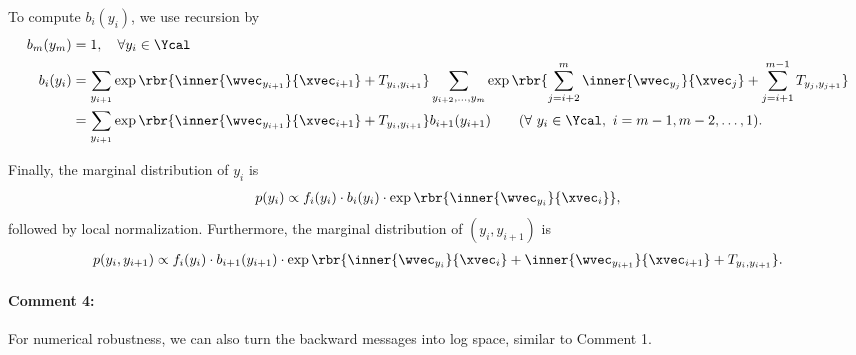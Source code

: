 \documentclass[11pt]{report}
\begin{document}
To compute $b_i(y_i)$, we use recursion by
\begin{align}
	\label{eq:rec_Z_forward_1}
	b_m(y_m) &= 1, \quad \forall y_i \in \Ycal \\
	b_i(y_i) &= \sum_{y_{i+1}} \exp \rbr{\inner{\wvec_{y_{i+1}}}{\xvec_{i+1}} + T_{y_{i}, y_{i+1}}}
	\sum_{y_{i+2}, \ldots, y_m} \exp \rbr{\sum_{j=i+2}^{m} \inner{\wvec_{y_j}}{\xvec_j} + \sum_{j=i+1}^{m-1} T_{y_j, y_{j+1}}} \\
	\label{eq:rec_Z_forward_2}
	&= \sum_{y_{i+1}}\exp \rbr{\inner{\wvec_{y_{i+1}}}{\xvec_{i+1}} + T_{y_{i}, y_{i+1}}} b_{i+1}(y_{i+1})  \qquad (\forall\ y_i \in \Ycal, \ i = m-1, m-2, \ldots, 1).	 
\end{align}

Finally, the marginal distribution of $y_i$ is
\begin{align}
	p(y_i) \propto f_i(y_i) \cdot b_i(y_i) \cdot \exp \rbr{\inner{\wvec_{y_{i}}}{\xvec_{i}}},
\end{align}
followed by local normalization.
Furthermore, the marginal distribution of $(y_i, y_{i+1})$ is
\begin{align}
	p(y_i, y_{i+1}) \propto f_i(y_i) \cdot b_{i+1}(y_{i+1}) \cdot 
	\exp \rbr{\inner{\wvec_{y_{i}}}{\xvec_{i}} + \inner{\wvec_{y_{i+1}}}{\xvec_{i+1}} + T_{y_i, y_{i+1}}}.
\end{align}

\paragraph{Comment 4:}
For numerical robustness,
we can also turn the backward messages into log space, similar to Comment 1.
\end{document}
